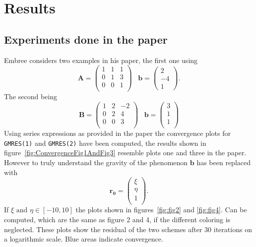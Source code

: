 \section{Results}
\subsection{Experiments done in the paper}
Embree considers two examples in his paper, the first one using
\begin{equation}
\mathbf{A} = \begin{pmatrix}
1 & 1 & 1 \\
0 & 1 & 3 \\
0 & 0 & 1 \\
\end{pmatrix}
\;\;\; 
\mathbf{b} = \begin{pmatrix}
2 \\ -4 \\ 1
\end{pmatrix}.
\end{equation}
The second being
\begin{equation}
\mathbf{B} =
\begin{pmatrix}
1 & 2 & -2 \\
0 & 2 & 4 \\
0 & 0 & 3 \\
\end{pmatrix}
\;\;\;
\mathbf{b} =
\begin{pmatrix}
3 \\
1 \\
1 \\
\end{pmatrix}
\end{equation}
Using series expressions as provided in the paper the convergence plots for \texttt{GMRES(1)} and \texttt{GMRES(2)} have been computed, the results shown in figure~\ref{fig:ConvergenceFig1AndFig3} resemble plots one and three in the paper. However to truly understand the gravity of the phenomenon $\mathbf{b}$ has been replaced with 
\begin{equation}
\mathbf{r_0} = \begin{pmatrix}
\xi \\ \eta \\ 1 \\
\end{pmatrix}.
\end{equation}
If $\xi \text{ and } \eta \in [-10,10]$ the plots shown in figures~\ref{fig:fig2} and \ref{fig:fig4}. Can be computed, which are the same as figure 2 and 4, if the different coloring is neglected. These plots show the residual of the two schemes after 30 iterations on a logarithmic scale. Blue areas indicate convergence. 

